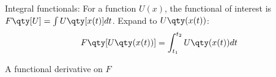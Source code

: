 Integral functionals: For a function \(U(x)\), the functional of interest is \(F\qty[U]=\int U\qty[x(t)]dt\).
Expand to \(U\qty(x(t))\):
\begin{align*}
	F\qty[U\qty(x(t))]=\int_{t_1}^{t_2} U\qty(x(t))dt
\end{align*}

A functional derivative on \(F\)